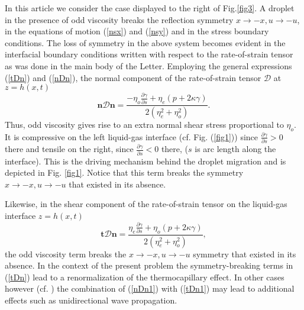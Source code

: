 \documentclass[%
 amsmath,amssymb,
 aps,
10.5pt]{revtex4-2}
\def\rr#1{(\ref{#1})}
\newcommand{\be}{\begin{equation}}
\newcommand{\ee}{\end{equation}}
\begin{document}
In this article we consider the case displayed to the right of Fig.\ref{fig3}. 
A droplet in the presence of odd viscosity breaks the reflection symmetry $x\rightarrow -x, u\rightarrow - u$, 
in the equations of motion \rr{nsx} and \rr{nsy}
and in the stress boundary conditions.
The loss of symmetry in the above system becomes evident in the interfacial boundary conditions
written with respect to the rate-of-strain tensor as was done in the main body of the Letter.  
Employing the general expressions \rr{tDn} and \rr{nDn}, the normal component of the rate-of-strain tensor $\mathcal{D}$ at $
z = h(x,t)$ 
\be \label{nDn1}
\mathbf{n} \mathcal{D} \mathbf{n} = \frac{  -\eta_o\frac{\partial \gamma}{\partial s}+ \eta_e (p + 2\kappa \gamma )  }{2(\eta_e^2  + \eta_o^2)}. 
\ee 
Thus, odd viscosity gives rise to an extra normal shear stress proportional to $\eta_o$. It is 
compressive on the left liquid-gas interface (cf. Fig. \rr{fig1}) since $\frac{\partial \gamma}{\partial s} >0$ there and tensile on the right, since $\frac{\partial \gamma}{\partial s} <0$ there, ($s$ is arc length along
the interface). This is the driving mechanism behind the droplet migration and 
is depicted in Fig. \ref{fig1}. Notice that this term breaks the symmetry
$x\rightarrow -x, u\rightarrow - u$ that existed in its absence. 

Likewise, in the shear component of the rate-of-strain tensor on the liquid-gas interface $
z = h(x,t)$ 
\be \label{tDn1}
\mathbf{t} \mathcal{D} \mathbf{n} = \frac{ \eta_e \frac{\partial \gamma}{\partial s}  + \eta_o (p + 2\kappa \gamma  )}{2(\eta_e^2  + \eta_o^2)}, 
\ee
the odd viscosity term breaks the $x\rightarrow -x, u\rightarrow - u$ symmetry that existed in its 
absence. In the context of the present problem the symmetry-breaking terms in \rr{tDn} lead
to a renormalization of the thermocapillary effect. In other cases however (cf. \cite{Soni2019})
the combination of \rr{nDn1} with \rr{tDn1} may lead to additional effects such as unidirectional
wave propagation. 
\end{document}
